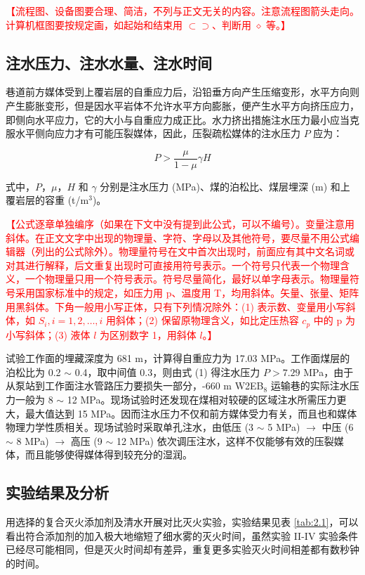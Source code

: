 \textcolor{red}{【流程图、设备图要合理、简洁，不列与正文无关的内容。注意流程图箭头走向。计算机框图要按规定画，如起始和结束用 $\subset \supset$、判断用 $\diamond$ 等。】}

\subsection{注水压力、注水水量、注水时间}
巷道前方媒体受到上覆岩层的自重应力后，沿铅垂方向产生压缩变形，水平方向则产生膨胀变形，但是因水平岩体不允许水平方向膨胀，便产生水平方向挤压应力，即侧向水平应力，它的大小与自重应力成正比\cite{ref7}。水力挤出措施注水压力最小应当克服水平侧向应力才有可能压裂媒体，因此，压裂疏松媒体的注水压力 $P$ 应为：

\begin{equation}
P > \frac{\mu}{1 - \mu} \gamma H
\end{equation}

式中，$P$，$\mu$，$H$ 和 $\gamma$ 分别是注水压力 (MPa)、煤的泊松比、煤层埋深 (m) 和上覆岩层的容重 (t/m$^3$)。

\textcolor{red}{【公式逐章单独编序（如果在下文中没有提到此公式，可以不编号）。变量注意用斜体。在正文文字中出现的物理量、字符、字母以及其他符号，要尽量不用公式编辑器（列出的公式除外）。物理量符号在文中首次出现时，前面应有其中文名词或对其进行解释，后文重复出现时可直接用符号表示。一个符号只代表一个物理含义，一个物理量只用一个符号表示。符号尽量简化，最好以单字母表示。物理量符号采用国家标准中的规定，如压力用 p、温度用 T，均用斜体。矢量、张量、矩阵用黑斜体。下角一般用小写正体，只有下列情况除外：(1) 表示数、变量用小写斜体，如 $S_i, i=1,2,\dots, i$ 用斜体；(2) 保留原物理含义，如比定压热容 $c_p$ 中的 p 为小写斜体；(3) 液体 $l$ 为区别数字 1，用斜体 $l$。】}

试验工作面的埋藏深度为 681 m，计算得自重应力为 17.03 MPa。工作面煤层的泊松比为 0.2 $\sim$ 0.4，取中间值 0.3，则由式 (1) 得注水压力 $P > 7.29$ MPa，由于从泵站到工作面注水管路压力要损失一部分，-660 m W2EB$_8$ 运输巷的实际注水压力一般为 8 $\sim$ 12 MPa。现场试验时还发现在煤相对较硬的区域注水所需压力更大，最大值达到 15 MPa。因而注水压力不仅和前方媒体受力有关，而且也和媒体物理力学性质相关。现场试验时采取单孔注水，由低压 (3 $\sim$ 5 MPa) $\to$ 中压 (6 $\sim$ 8 MPa) $\to$ 高压 (9 $\sim$ 12 MPa) 依次调压注水，这样不仅能够有效的压裂媒体，而且能够使得媒体得到较充分的湿润。

\subsection{实验结果及分析}
用选择的复合灭火添加剂及清水开展对比灭火实验，实验结果见表 \ref{tab:2.1}，可以看出符合添加剂的加入极大地缩短了细水雾的灭火时间，虽然实验 II-IV 实验条件已经尽可能相同，但是灭火时间却有差异，重复更多实验灭火时间相差都有数秒钟的时间。

